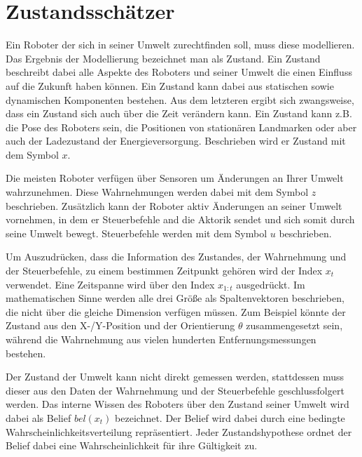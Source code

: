 %
%
%
\section{Zustandsschätzer}

Ein Roboter der sich in seiner Umwelt zurechtfinden soll, muss diese modellieren. Das Ergebnis der Modellierung bezeichnet man als Zustand. Ein Zustand beschreibt dabei alle Aspekte des Roboters und seiner Umwelt die einen Einfluss auf die Zukunft haben können. Ein Zustand kann dabei aus statischen sowie dynamischen Komponenten bestehen. Aus dem letzteren ergibt sich zwangsweise, dass ein Zustand sich auch über die Zeit verändern kann. Ein Zustand kann z.B. die Pose des Roboters sein, die Positionen von stationären Landmarken oder aber auch der Ladezustand der Energieversorgung. Beschrieben wird er Zustand mit dem Symbol $x$.

Die meisten Roboter verfügen über Sensoren um Änderungen an Ihrer Umwelt wahrzunehmen. Diese Wahrnehmungen werden dabei mit dem Symbol $z$ beschrieben. Zusätzlich kann der Roboter aktiv Änderungen an seiner Umwelt vornehmen, in dem er Steuerbefehle and die Aktorik sendet und sich somit durch seine Umwelt bewegt. Steuerbefehle werden mit dem Symbol $u$ beschrieben.

Um Auszudrücken, dass die Information des Zustandes, der Wahrnehmung und der Steuerbefehle, zu einem bestimmen Zeitpunkt gehören wird der Index $x_t$ verwendet. Eine Zeitspanne wird über den Index $x_{1:t}$ ausgedrückt. Im mathematischen Sinne werden alle drei Größe als Spaltenvektoren beschrieben, die nicht über die gleiche Dimension verfügen müssen. Zum Beispiel könnte der Zustand aus den X-/Y-Position und der Orientierung $\theta$ zusammengesetzt sein, während die Wahrnehmung aus vielen hunderten Entfernungsmessungen bestehen.

Der Zustand der Umwelt kann nicht direkt gemessen werden, stattdessen muss dieser aus den Daten der Wahrnehmung und der Steuerbefehle geschlussfolgert werden. Das interne Wissen des Roboters über den Zustand seiner Umwelt wird dabei als Belief $bel(x_t)$ bezeichnet. Der Belief wird dabei durch eine bedingte Wahrscheinlichkeitsverteilung repräsentiert. Jeder Zustandshypothese ordnet der Belief dabei eine Wahrscheinlichkeit für ihre Gültigkeit zu.


%
%
